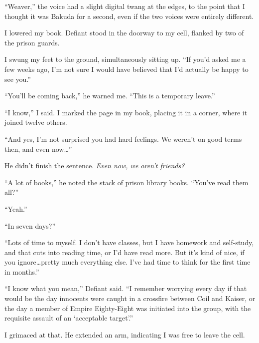 





``Weaver,'' the voice had a slight digital twang at the edges, to the point that I thought it was Bakuda for a second, even if the two voices were entirely different.



I lowered my book.  Defiant stood in the doorway to my cell, flanked by two of the prison guards.



I swung my feet to the ground, simultaneously sitting up.  ``If you'd asked me a few weeks ago, I'm not sure I would have believed that I'd actually be happy to see you.''



``You'll be coming back,'' he warned me.  ``This is a temporary leave.''



``I know,'' I said.  I marked the page in my book, placing it in a corner, where it joined twelve others.



``And yes, I'm not surprised you had hard feelings.  We weren't on good terms then, and even now\ldots''



He didn't finish the sentence.  \emph{Even now, we aren't friends?}



``A lot of books,'' he noted the stack of prison library books.  ``You've read them all?''



``Yeah.''



``In seven days?''



``Lots of time to myself.  I don't have classes, but I have homework and self-study, and that cuts into reading time, or I'd have read more.  But it's kind of nice, if you ignore\ldots pretty much everything else.  I've had time to think for the first time in months.''



``I know what you mean,'' Defiant said.  ``I remember worrying every day if that would be the day innocents were caught in a crossfire between Coil and Kaiser, or the day a member of Empire Eighty-Eight was initiated into the group, with the requisite assault of an `acceptable target'.''



I grimaced at that.  He extended an arm, indicating I was free to leave the cell.




